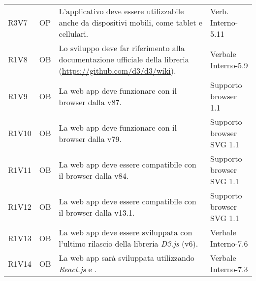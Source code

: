 {\begin{longtable}{C{2cm} | C{1.5cm} | C{9cm} | C{3.3cm}}
R3V7 & OP & L'applicativo deve essere utilizzabile anche da dispositivi mobili, come tablet e cellulari. & Verb. Interno-5.11\\
R1V8 & OB & Lo sviluppo deve far riferimento alla documentazione ufficiale della libreria (\textcolor{blue}{\url{https://github.com/d3/d3/wiki}}). & Verbale Interno-5.9 \\
R1V9 & OB & La web app deve funzionare con il browser  dalla v87. & Supporto browser  1.1 \\
R1V10 & OB & La web app deve funzionare con il browser  dalla v79. & Supporto browser SVG 1.1 \\
R1V11 & OB & La web app deve essere compatibile con il browser  dalla v84. & Supporto browser SVG 1.1\\
R1V12 & OB & La web app deve essere compatibile con il browser  dalla v13.1. & Supporto browser SVG 1.1\\
R1V13 & OB & La web app deve essere sviluppata con l'ultimo rilascio della libreria \textit{D3.js} (v6). & Verbale Interno-7.6\\
R1V14 & OB & La web app sarà sviluppata utilizzando \textit{React.js} e \textit{}. & Verbale Interno-7.3\\

\end{longtable}
}
